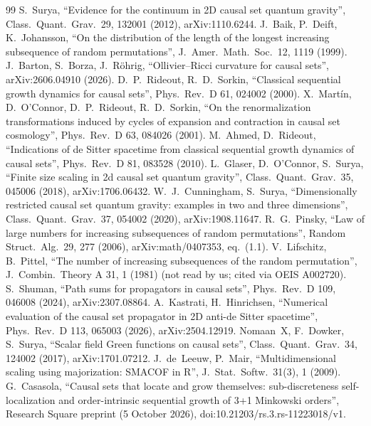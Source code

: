 \documentclass[11pt,a4paper]{article}
\begin{document}
\begin{thebibliography}{99}
 S.~Surya, ``Evidence for the continuum in 2D causal set quantum gravity'', Class.\ Quant.\ Grav.\ 29, 132001 (2012), arXiv:1110.6244.
 J.~Baik, P.~Deift, K.~Johansson, ``On the distribution of the length of the longest increasing subsequence of random permutations'', J.\ Amer.\ Math.\ Soc.\ 12, 1119 (1999).
 J.~Barton, S.~Borza, J.~R\"ohrig, ``Ollivier--Ricci curvature for causal sets'', arXiv:2606.04910 (2026).
 D.~P.~Rideout, R.~D.~Sorkin, ``Classical sequential growth dynamics for causal sets'', Phys.\ Rev.\ D 61, 024002 (2000).
 X.~Mart\'in, D.~O'Connor, D.~P.~Rideout, R.~D.~Sorkin, ``On the renormalization transformations induced by cycles of expansion and contraction in causal set cosmology'', Phys.\ Rev.\ D 63, 084026 (2001).
 M.~Ahmed, D.~Rideout, ``Indications of de Sitter spacetime from classical sequential growth dynamics of causal sets'', Phys.\ Rev.\ D 81, 083528 (2010).
 L.~Glaser, D.~O'Connor, S.~Surya, ``Finite size scaling in 2d causal set quantum gravity'', Class.\ Quant.\ Grav.\ 35, 045006 (2018), arXiv:1706.06432.
 W.~J.~Cunningham, S.~Surya, ``Dimensionally restricted causal set quantum gravity: examples in two and three dimensions'', Class.\ Quant.\ Grav.\ 37, 054002 (2020), arXiv:1908.11647.
 R.~G.~Pinsky, ``Law of large numbers for increasing subsequences of random permutations'', Random Struct.\ Alg.\ 29, 277 (2006), arXiv:math/0407353, eq.~(1.1).
 V.~Lifschitz, B.~Pittel, ``The number of increasing subsequences of the random permutation'', J.\ Combin.\ Theory A 31, 1 (1981) (not read by us; cited via OEIS A002720).
 S.~Shuman, ``Path sums for propagators in causal sets'', Phys.\ Rev.\ D 109, 046008 (2024), arXiv:2307.08864.
 A.~Kastrati, H.~Hinrichsen, ``Numerical evaluation of the causal set propagator in 2D anti-de Sitter spacetime'', Phys.\ Rev.\ D 113, 065003 (2026), arXiv:2504.12919.
 Nomaan~X, F.~Dowker, S.~Surya, ``Scalar field Green functions on causal sets'', Class.\ Quant.\ Grav.\ 34, 124002 (2017), arXiv:1701.07212.
 J.~de~Leeuw, P.~Mair, ``Multidimensional scaling using majorization: SMACOF in R'', J.\ Stat.\ Softw.\ 31(3), 1 (2009).
 G.~Casasola, ``Causal sets that locate and grow themselves: sub-discreteness self-localization and order-intrinsic sequential growth of 3+1 Minkowski orders'', Research Square preprint (5 October 2026), doi:10.21203/rs.3.rs-11223018/v1.

\end{thebibliography}
\end{document}
